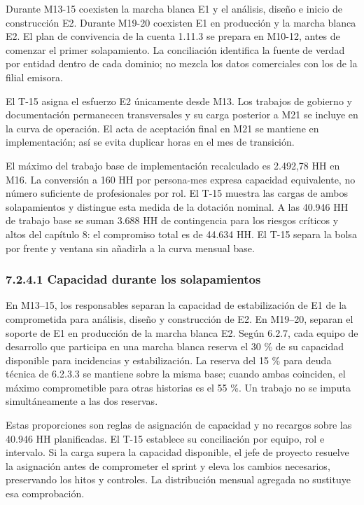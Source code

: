 \documentclass[11pt]{article}
\begin{document}
Durante M13-15 coexisten la marcha blanca E1 y el análisis, diseño e inicio de construcción E2. Durante M19-20 coexisten E1 en producción y la marcha blanca E2. El plan de convivencia de la cuenta 1.11.3 se prepara en M10-12, antes de comenzar el primer solapamiento. La conciliación identifica la fuente de verdad por entidad dentro de cada dominio; no mezcla los datos comerciales con los de la filial emisora.

El T-15 asigna el esfuerzo E2 únicamente desde M13. Los trabajos de gobierno y documentación permanecen transversales y su carga posterior a M21 se incluye en la curva de operación. El acta de aceptación final en M21 se mantiene en implementación; así se evita duplicar horas en el mes de transición.

El máximo del trabajo base de implementación recalculado es 2.492,78 HH en M16. La conversión a 160 HH por persona-mes expresa capacidad equivalente, no número suficiente de profesionales por rol. El T-15 muestra las cargas de ambos solapamientos y distingue esta medida de la dotación nominal. A las 40.946 HH de trabajo base se suman 3.688 HH de contingencia para los riesgos críticos y altos del capítulo 8: el compromiso total es de 44.634 HH. El T-15 separa la bolsa por frente y ventana sin añadirla a la curva mensual base.

\subsubsection{7.2.4.1 Capacidad durante los solapamientos}

En M13–15, los responsables separan la capacidad de estabilización de E1 de la comprometida para análisis, diseño y construcción de E2. En M19–20, separan el soporte de E1 en producción de la marcha blanca E2. Según 6.2.7, cada equipo de desarrollo que participa en una marcha blanca reserva el 30 \% de su capacidad disponible para incidencias y estabilización. La reserva del 15 \% para deuda técnica de 6.2.3.3 se mantiene sobre la misma base; cuando ambas coinciden, el máximo comprometible para otras historias es el 55 \%. Un trabajo no se imputa simultáneamente a las dos reservas.

Estas proporciones son reglas de asignación de capacidad y no recargos sobre las 40.946 HH planificadas. El T-15 establece su conciliación por equipo, rol e intervalo. Si la carga supera la capacidad disponible, el jefe de proyecto resuelve la asignación antes de comprometer el sprint y eleva los cambios necesarios, preservando los hitos y controles. La distribución mensual agregada no sustituye esa comprobación.
\end{document}
